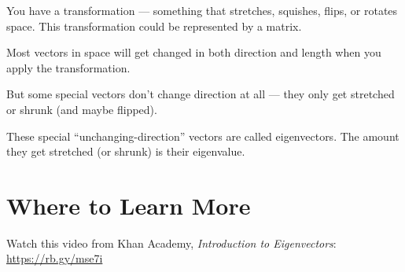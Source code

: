 You have a transformation — something that stretches, squishes, flips, or rotates space.
This transformation could be represented by a matrix.

Most vectors in space will get changed in both direction and length when you apply the transformation.

But some special vectors don't change direction at all — they only get stretched or shrunk (and maybe flipped).

These special “unchanging-direction” vectors are called eigenvectors.
The amount they get stretched (or shrunk) is their eigenvalue.

\section{Where to Learn More}
Watch this video from Khan Academy, \emph{Introduction to Eigenvectors}: \url{https://rb.gy/mse7i}
